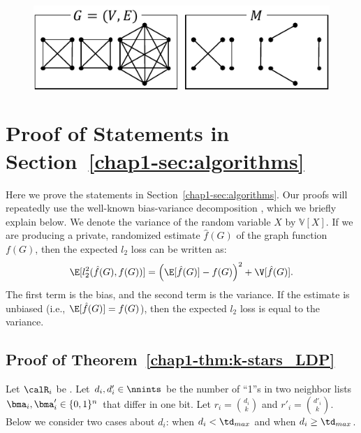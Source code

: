 
\begin{figure}[t]
  \centering
  \includegraphics[width=0.88\linewidth]{fig/IndCube_triangle.pdf}
  \caption{
  }\label{chap1-fig:mono-cube_triangle}
\end{figure}


\section{Proof of Statements in Section~\ref{chap1-sec:algorithms}}
\label{chap1-sec:proof}
Here we prove the statements in Section~\ref{chap1-sec:algorithms}. 
Our proofs will repeatedly use the well-known bias-variance decomposition \cite{mlpp}, which we briefly explain below. 
We denote the variance of the random variable $X$ by $\mathbb{V}[X]$. 
If we are producing a private, randomized estimate $\hat{f}(G)$ of the graph function $f(G)$, then the expected $l_2$ loss can be written as: 
\begin{equation}\label{chap1-eq:bias-var}
  \E[l_2^2(\hat{f}(G),f(G))] = \left(\E[\hat{f}(G)] - f(G)\right)^2
  + \V[\hat{f}(G)].
\end{equation}
The first term is the bias, and the second term is the variance. 
If the estimate is unbiased (i.e., $\E[\hat{f}(G)] = f(G)$), then the expected $l_2$ loss is equal to the variance.

\subsection{Proof of Theorem~\ref{chap1-thm:k-stars_LDP}}
Let $\calR_i$ be . 
Let $d_i,d'_i \in \nnints$ be the number of ``1''s in two neighbor lists $\bma_i,\bma'_i \in \{0,1\}^n$ that differ in one bit. 
Let $r_i = \binom{d_i}{k}$ and $r'_i = \binom{d'_i}{k}$. 
Below we consider two cases about $d_i$: when $d_i < \td_{max}$ and when $d_i \geq \td_{max}$.

